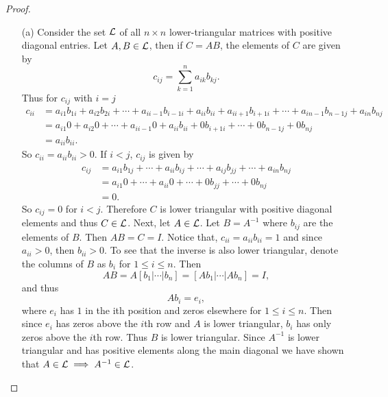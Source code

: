 \documentclass[12pt]{report}
\begin{document}
\begin{problem}
\begin{proof}
\begin{enumerate}
    \item [(a)]
    Consider the set ${\mathcal{L}}$ of all $n \times n$ lower-triangular matrices with positive diagonal entries. Let $A,B \in {\mathcal{L}}$, then if $C = AB$, the elements of $C$ are given by
    \[
         c_{ij} = \sum_{k=1}^n a_{ik} b_{kj}.
    \]
    Thus for $c_{ij}$ with $i=j$
    \begin{align*}
        c_{ii} &= a_{i1}b_{1i} + a_{i2}b_{2i} +  \cdots +a_{ii-1}b_{i-1i} + a_{ii}b_{ii} + a_{ii+1}b_{i+1i} + \cdots + a_{in-1}b_{n-1j} + a_{in}b_{nj}\\
        &= a_{i1}0 + a_{i2}0 +  \cdots +a_{ii-1}0 + a_{ii}b_{ii} + 0b_{i+1i} + \cdots + 0b_{n-1j} + 0b_{nj}\\
        &= a_{ii}b_{ii}.
    \end{align*}
    So $c_{ii} = a_{ii}b_{ii} > 0$. If $i < j$, $c_{ij}$ is given by
    \begin{align*}
        c_{ij} &= a_{i1}b_{1j} +  \cdots + a_{ii}b_{ij} +  \cdots + a_{ij}b_{jj} + \cdots + a_{in}b_{nj}\\
        &= a_{i1}0 + \cdots + a_{ii}0 + \cdots + 0 b_{jj} + \cdots + 0b_{nj}\\
        &= 0.
    \end{align*}
    So $c_{ij} = 0$ for $i < j$. Therefore $C$ is lower triangular with positive diagonal elements and thus $C \in {\mathcal{L}}$. Next, let $A \in {\mathcal{L}}$. Let $B = A^{-1}$ where $b_{ij}$ are the elements of $B$. Then $AB = C = I$. Notice that, $c_{ii} = a_{ii}b_{ii} = 1$ and since $a_{ii} > 0$, then $b_{ii} >0$. To see that the inverse is also lower triangular, denote the columns of $B$ as $b_i$ for $1 \leq i \leq n$. Then
    \[
         AB = A[b_1 | \cdots | b_n] = [Ab_1 | \cdots | Ab_n] = I,
    \]
    and thus
    \[
         Ab_i = e_i,
    \]
    where $e_i$ has $1$ in the ith position and zeros elsewhere for $1 \leq i \leq n$. Then since $e_i$ has zeros above the $i$th row and $A$ is lower triangular, $b_i$ has only zeros above the $i$th row. Thus $B$ is lower triangular. Since $A^{-1}$ is lower triangular and has positive elements along the main diagonal we have shown that $A \in {\mathcal{L}} \implies A^{-1} \in {\mathcal{L}}$.




\end{enumerate}
\end{proof}
\end{problem}
\end{document}
